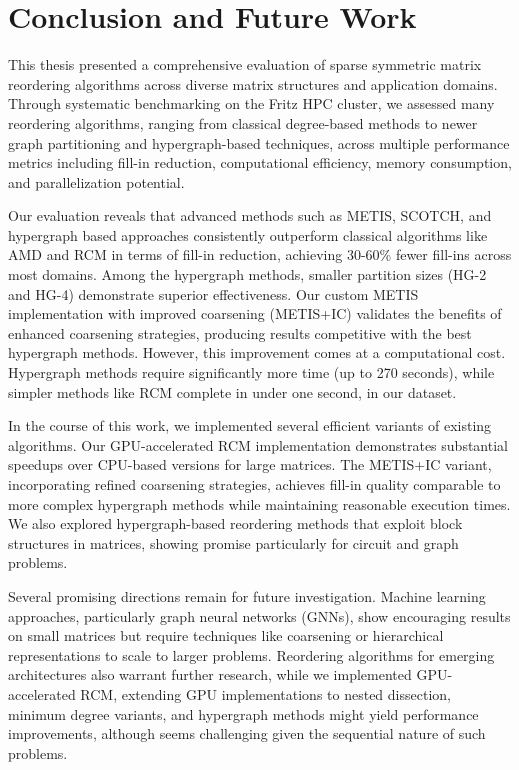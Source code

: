 \chapter{Conclusion and Future Work}
\label{ch:conclusion}

This thesis presented a comprehensive evaluation of sparse symmetric matrix reordering algorithms across diverse matrix structures and application domains. Through systematic benchmarking on the Fritz HPC cluster, we assessed many reordering algorithms, ranging from classical degree-based methods to newer graph partitioning and hypergraph-based techniques, across multiple performance metrics including fill-in reduction, computational efficiency, memory consumption, and parallelization potential.

Our evaluation reveals that advanced methods such as METIS, SCOTCH, and hypergraph based approaches consistently outperform classical algorithms like AMD and RCM in terms of fill-in reduction, achieving 30-60\% fewer fill-ins across most domains. Among the hypergraph methods, smaller partition sizes (HG-2 and HG-4) demonstrate superior effectiveness. Our custom METIS implementation with improved coarsening (METIS+IC) validates the benefits of enhanced coarsening strategies, producing results competitive with the best hypergraph methods. However, this improvement comes at a computational cost. Hypergraph methods require significantly more time (up to 270 seconds), while simpler methods like RCM complete in under one second, in our dataset.

In the course of this work, we implemented several efficient variants of existing algorithms. Our GPU-accelerated RCM implementation demonstrates substantial speedups over CPU-based versions for large matrices. The METIS+IC variant, incorporating refined coarsening strategies, achieves fill-in quality comparable to more complex hypergraph methods while maintaining reasonable execution times. We also explored hypergraph-based reordering methods that exploit block structures in matrices, showing promise particularly for circuit and graph problems. 


Several promising directions remain for future investigation. Machine learning approaches, particularly graph neural networks (GNNs), show encouraging results on small matrices but require techniques like coarsening or hierarchical representations to scale to larger problems. Reordering algorithms for emerging architectures also warrant further research, while we implemented GPU-accelerated RCM, extending GPU implementations to nested dissection, minimum degree variants, and hypergraph methods might yield performance improvements, although seems challenging given the sequential nature of such problems. 
